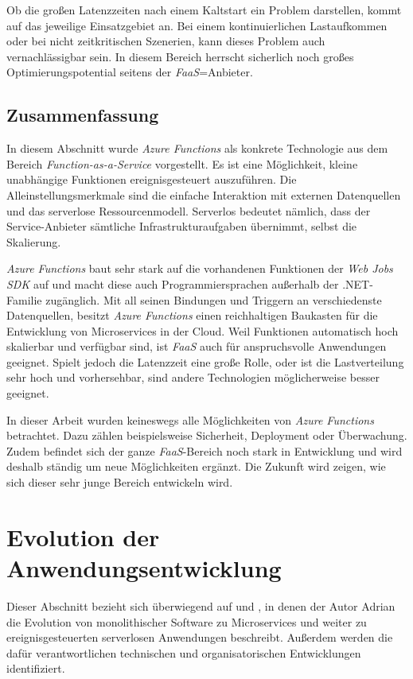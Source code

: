 Ob die großen Latenzzeiten nach einem Kaltstart ein Problem darstellen, kommt auf das jeweilige Einsatzgebiet an. Bei einem kontinuierlichen Lastaufkommen oder bei nicht zeitkritischen Szenerien, kann dieses Problem auch vernachlässigbar sein. In diesem Bereich herrscht sicherlich noch großes Optimierungspotential seitens der \textit{FaaS}=Anbieter.

\subsection{Zusammenfassung}

In diesem Abschnitt wurde \textit{Azure Functions} als konkrete Technologie aus dem Bereich \textit{Function-as-a-Service} vorgestellt. Es ist eine Möglichkeit, kleine unabhängige Funktionen ereignisgesteuert auszuführen. Die Alleinstellungsmerkmale sind die einfache Interaktion mit externen Datenquellen und das serverlose Ressourcenmodell. Serverlos bedeutet nämlich, dass der Service-Anbieter sämtliche Infrastrukturaufgaben übernimmt, selbst die Skalierung.

\textit{Azure Functions} baut sehr stark auf die vorhandenen Funktionen der \textit{Web Jobs SDK} auf und macht diese auch Programmiersprachen außerhalb der .NET-Familie zugänglich. Mit all seinen Bindungen und Triggern an verschiedenste Datenquellen, besitzt \textit{Azure Functions} einen reichhaltigen Baukasten für die Entwicklung von Microservices in der Cloud. Weil Funktionen automatisch hoch skalierbar und verfügbar sind, ist \textit{FaaS} auch für anspruchsvolle Anwendungen geeignet. Spielt jedoch die Latenzzeit eine große Rolle, oder ist die Lastverteilung sehr hoch und vorhersehbar, sind andere Technologien möglicherweise besser geeignet.

In dieser Arbeit wurden keineswegs alle Möglichkeiten von \textit{Azure Functions} betrachtet. Dazu zählen beispielsweise Sicherheit, Deployment oder Überwachung. Zudem befindet sich der ganze \textit{FaaS}-Bereich noch stark in Entwicklung und wird deshalb ständig um neue Möglichkeiten ergänzt. Die Zukunft wird zeigen, wie sich dieser sehr junge Bereich entwickeln wird.

\section{Evolution der Anwendungsentwicklung}

Dieser Abschnitt bezieht sich überwiegend auf \cite{Cock16EvoFunc} und \cite{Cock17ShrinkingMS}, in denen der Autor Adrian \citeauthor{Cock16EvoFunc} die Evolution von monolithischer Software zu Microservices und weiter zu ereignisgesteuerten serverlosen Anwendungen beschreibt. Außerdem werden die dafür verantwortlichen technischen und organisatorischen Entwicklungen identifiziert.


